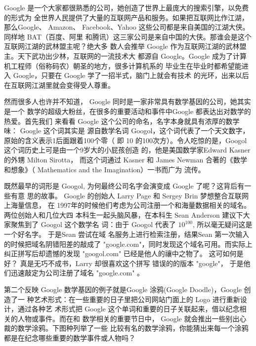 Google 是一个大家都很熟悉的公司，她创造了世界上最庞大的搜索引擎，以免费的形式为
全世界人民提供了大量的互联网产品和服务。如果把互联网比作江湖，那么Google、
Amazon、 Facebook、Yahoo 这些公司都是来自美国的江湖大侠。同样地 BAT（百度、阿里
和腾讯）这三家公司是来自中国的大侠。那谁会是这个互联网江湖的武林盟主呢？绝大多
数人会推举 Google 作为互联网江湖的武林盟主。天下武功出少林，互联网的一流技术大
都源自 Google。Google 成为了计算机工程师（俗称码农）朝圣的地方，很多计算机系的
毕业生在毕业时都希望能进入 Google，只要在 Google 学了一招半式，脑门上就会有技术
的光环，出来以后在互联网江湖里就会变得受人尊重。

然而很多人也许并不知道， Google 同时是一家非常具有数学基因的公司，她其实是一个
数学的超级大粉丝，在很多的重要活动和事件中Google 都表达出对数学的热爱。首先我们
来看看 Google 这个公司的命名，名字本身就具有浓厚的数学味： Google 这个词其实是
源自数学名词 Googol，这个词代表了一个天文数字，原始的含义表示1后面跟着100个零（
即 10 的100次方）。令人吃惊的是，Googol这个词历史上可是由一个9岁大的小屁孩创造
的，他是美国数学家Edward Kasner 的外甥 Milton Sirotta， 而这个词通过 Kasner 和
James Newman 合著的《数学和想象》（ Mathematics and the Imagination）一书而广为
流传。

既然最早的词形是 Googol, 为何最终公司名字会演变成 Google 了呢？这背后有一些有意
思的故事。 Google 的创始人 Larry Page 和 Sergey Brin 梦想整合互联网上海量信息，
在 1997年的时候他们考虑为公司注册一个和海量数据相关的域名。两位创始人和几位大四
本科生一起头脑风暴，在本科生 Sean Anderson 建议下大家聚焦到了 Googol 这个数学名
词：由于 Googol 代表了 $10^100$, 所以毫无疑问这是一个好名字。 于是Sean 尝试在域
名服务上进行检索注册，结果Sean 第一次输入的时候把域名阴错阳差的敲成了
"google.com"，同时发现这个域名可用。而实际上纠正拼写后却遗憾的发现 "googol.com"
已经是他人的禳中之物了。 这可如何是好？ 真是无巧不成书，Larry 却很喜欢这个拼写
错误的的版本 "google"， 于是他们迅速敲定为公司注册了域名 "google.com" 。 


第二个反映 Google 数学基因的例子就是Google 涂鸦(Google Doodle)，Google 创造了一
种艺术形式：在一些重要的日子里把公司网站门面上的 Logo 进行重新设计，通过各种艺
术形式把 Google 这个单词和重要的日子关联起来，借以纪念相关的人物或事件。而在和
数学相关的重要节日中， Google 就会推出一些别出心裁的数学涂鸦。下图种列举了一些
比较有名的数学涂鸦，你能猜出来每一个涂鸦都是在纪念哪些重要的数学事件或人物吗？


